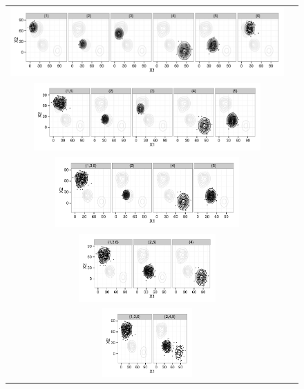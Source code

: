 \documentclass[10pt, a4paper]{article}
\begin{document}
\begin{spacing}{1.9}
\begin{figure}[thbp]
\begin{center}
\begin{tabular}{cc}
  \includegraphics[trim=0cm 0cm 0cm 0cm,width=\textwidth]{partition-example-part6.pdf} \\
    \includegraphics[trim=0cm 0cm 0cm 0cm,width=0.83\textwidth]{partition-example-part5.pdf} \\
      \includegraphics[trim=0cm 0cm 0cm 0cm,width=0.67\textwidth]{partition-example-part4.pdf} \\
        \includegraphics[trim=0cm 0cm 0cm 0cm,width=0.5\textwidth]{partition-example-part3a.pdf} \\
          \includegraphics[trim=0cm 0cm 0cm 0cm,width=0.33\textwidth]{partition-example-part2.pdf} \\

\end{tabular}
\end{center}
\end{figure}
\end{spacing}
\end{document}
